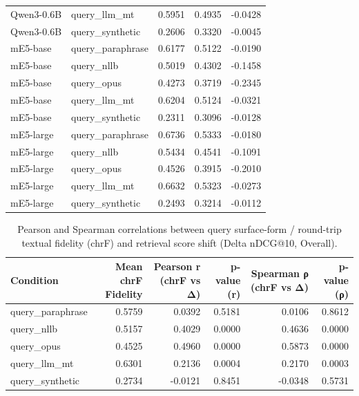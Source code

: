 \begin{table}
\begin{tabular}{llrrr}
Qwen3-0.6B & query_llm_mt & 0.5951 & 0.4935 & -0.0428 \\
Qwen3-0.6B & query_synthetic & 0.2606 & 0.3320 & -0.0045 \\
mE5-base & query_paraphrase & 0.6177 & 0.5122 & -0.0190 \\
mE5-base & query_nllb & 0.5019 & 0.4302 & -0.1458 \\
mE5-base & query_opus & 0.4273 & 0.3719 & -0.2345 \\
mE5-base & query_llm_mt & 0.6204 & 0.5124 & -0.0321 \\
mE5-base & query_synthetic & 0.2311 & 0.3096 & -0.0128 \\
mE5-large & query_paraphrase & 0.6736 & 0.5333 & -0.0180 \\
mE5-large & query_nllb & 0.5434 & 0.4541 & -0.1091 \\
mE5-large & query_opus & 0.4526 & 0.3915 & -0.2010 \\
mE5-large & query_llm_mt & 0.6632 & 0.5323 & -0.0273 \\
mE5-large & query_synthetic & 0.2493 & 0.3214 & -0.0112 \\
\bottomrule
\end{tabular}
\end{table}


\begin{table}
\caption{Pearson and Spearman correlations between query surface-form / round-trip textual fidelity (chrF) and retrieval score shift (Delta nDCG@10, Overall).}
\label{tab:translation_correlations_overall}
\begin{tabular}{lrrrrr}
\toprule
Condition & Mean chrF Fidelity & Pearson r (chrF vs Δ) & p-value (r) & Spearman ρ (chrF vs Δ) & p-value (ρ) \\
\midrule
query_paraphrase & 0.5759 & 0.0392 & 0.5181 & 0.0106 & 0.8612 \\
query_nllb & 0.5157 & 0.4029 & 0.0000 & 0.4636 & 0.0000 \\
query_opus & 0.4525 & 0.4960 & 0.0000 & 0.5873 & 0.0000 \\
query_llm_mt & 0.6301 & 0.2136 & 0.0004 & 0.2170 & 0.0003 \\
query_synthetic & 0.2734 & -0.0121 & 0.8451 & -0.0348 & 0.5731 \\
\bottomrule
\end{tabular}
\end{table}


